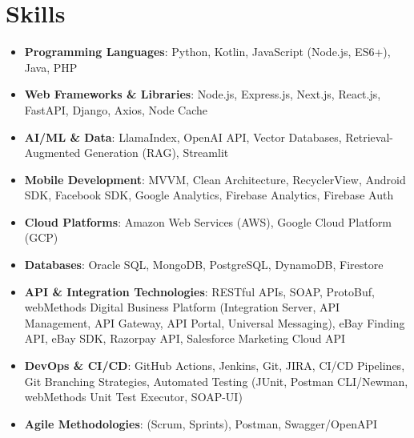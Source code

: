 \documentclass[letterpaper,10pt]{article}
\newcommand{\resumeItem}[1]{
  \item\small{
    {#1 \vspace{-2pt}}
  }
}
\newcommand{\resumeItemListStart}{\begin{itemize}[leftmargin=*, itemsep=-1pt]}
\newcommand{\resumeItemListEnd}{\end{itemize}\vspace{-5pt}}
\begin{document}
\section{Skills}
\resumeItemListStart
  \resumeItem{\textbf{Programming Languages}: Python, Kotlin, JavaScript (Node.js, ES6+), Java, PHP}
  \resumeItem{\textbf{Web Frameworks \& Libraries}: Node.js, Express.js, Next.js, React.js, FastAPI, Django, Axios, Node Cache}
  \resumeItem{\textbf{AI/ML \& Data}: LlamaIndex, OpenAI API, Vector Databases, Retrieval-Augmented Generation (RAG), Streamlit}
  \resumeItem{\textbf{Mobile Development}: MVVM, Clean Architecture, RecyclerView, Android SDK, Facebook SDK, Google Analytics, Firebase Analytics, Firebase Auth}
  \resumeItem{\textbf{Cloud Platforms}: Amazon Web Services (AWS), Google Cloud Platform (GCP)}
  \resumeItem{\textbf{Databases}: Oracle SQL, MongoDB, PostgreSQL, DynamoDB, Firestore}
  \resumeItem{\textbf{API \& Integration Technologies}: RESTful APIs, SOAP, ProtoBuf, webMethods Digital Business Platform (Integration Server, API Management, API Gateway, API Portal, Universal Messaging), eBay Finding API, eBay SDK, Razorpay API, Salesforce Marketing Cloud API}
  \resumeItem{\textbf{DevOps \& CI/CD}: GitHub Actions, Jenkins, Git, JIRA, CI/CD Pipelines, Git Branching Strategies, Automated Testing (JUnit, Postman CLI/Newman, webMethods Unit Test Executor, SOAP-UI)}
  \resumeItem{\textbf{Agile Methodologies}: (Scrum, Sprints), Postman, Swagger/OpenAPI}
\resumeItemListEnd
\end{document}
